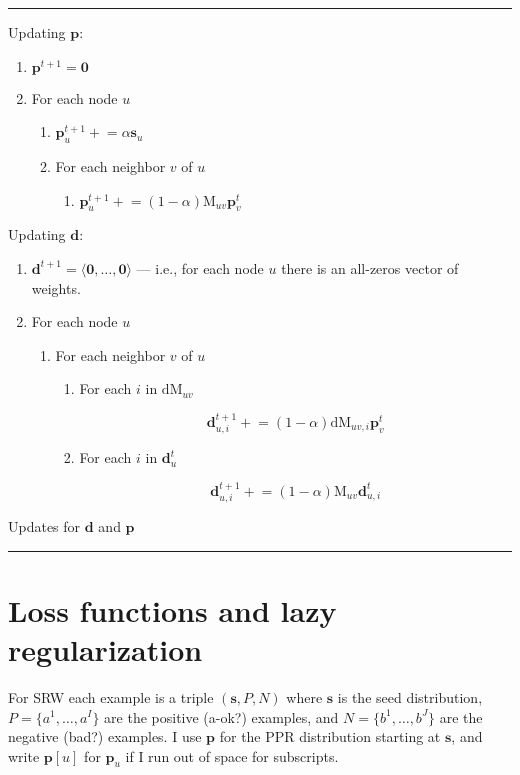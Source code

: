 \documentclass[12pt]{article}
\newcommand{\vek}[1]{\textbf{#1}}
\newcommand{\M}{\textrm{M}}
\newcommand{\dM}{\textrm{dM}}
\begin{document}
\begin{table}
\hrule

Updating $\vek{p}$:
\begin{enumerate}
\item $\vek{p}^{t+1} = \vek{0}$
\item For each node $u$ 
  \begin{enumerate}
  \item $\vek{p}^{t+1}_u +\!\!= \alpha \vek{s}_u$
  \item For each neighbor $v$ of $u$
    \begin{enumerate}
    \item $\vek{p}^{t+1}_u +\!\!= (1-\alpha) \M_{uv} \vek{p}^t_v$
    \end{enumerate}
  \end{enumerate}
\end{enumerate}

Updating $\vek{d}$:
\begin{enumerate}
\item $\vek{d}^{t+1} = \langle \vek{0}, \ldots, \vek{0} \rangle$ --- i.e., for each node $u$ there is an all-zeros
  vector of weights.
\item For each node $u$ 
  \begin{enumerate}
  \item For each neighbor $v$ of $u$
    \begin{enumerate}
      \item For each $i$ in $\dM_{uv}$

      \[ \vek{d}^{t+1}_{u,i} +\!\!= (1-\alpha) \dM_{uv,i} \vek{p}^t_v \]
      \item For each $i$ in $\vek{d}^t_{u}$

      \[ \vek{d}^{t+1}_{u,i} +\!\!= (1-\alpha) \M_{uv} \vek{d}^t_{u,i} \]
    \end{enumerate}
  \end{enumerate}
\end{enumerate}
\caption{Updates for $\vek{d}$ and $\vek{p}$} \label{alg:updates}
\hrule
\end{table}

\section{Loss functions and lazy regularization}

For SRW each example is a triple $(\vek{s},P,N)$ where $\vek{s}$ is
the seed distribution, $P=\{a^1,\ldots,a^I\}$ are the positive (a-ok?)
examples, and $N=\{b^1,\ldots,b^J\}$ are the negative (bad?) examples.
I use $\vek{p}$ for the PPR distribution starting at $\vek{s}$, and
write $\vek{p}[u]$ for $\vek{p}_u$ if I run out of space for
subscripts.
\end{document}
